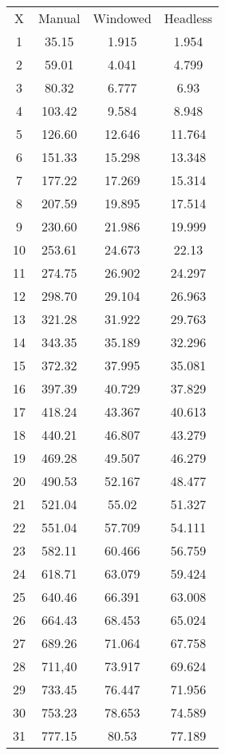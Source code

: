 \begin{table}[]
    \centering
    \begin{tabular}{c c c c}
    X & Manual & Windowed & Headless  \\
    1 & 35.15 & 1.915 & 1.954  \\
    2 & 59.01 & 4.041 & 4.799  \\
    3 & 80.32 & 6.777 & 6.93  \\
    4 & 103.42 & 9.584 & 8.948  \\
    5 & 126.60 & 12.646 & 11.764  \\
    6 & 151.33 & 15.298 & 13.348  \\
    7 & 177.22 & 17.269 & 15.314  \\
    8 & 207.59 & 19.895 & 17.514  \\
    9 & 230.60 & 21.986 & 19.999  \\
    10 & 253.61 & 24.673 & 22.13  \\
    11 & 274.75 & 26.902 & 24.297  \\
    12 & 298.70 & 29.104 & 26.963  \\
    13 & 321.28 & 31.922 & 29.763  \\
    14 & 343.35 & 35.189 & 32.296  \\
    15 & 372.32 & 37.995 & 35.081  \\
    16 & 397.39 & 40.729 & 37.829  \\
    17 & 418.24 & 43.367 & 40.613  \\
    18 & 440.21 & 46.807 & 43.279  \\
    19 & 469.28 & 49.507 & 46.279  \\
    20 & 490.53 & 52.167 & 48.477  \\
    21 & 521.04 & 55.02 & 51.327  \\
    22 & 551.04 & 57.709 & 54.111  \\
    23 & 582.11 & 60.466 & 56.759  \\
    24 & 618.71 & 63.079 & 59.424  \\
    25 & 640.46 & 66.391 & 63.008  \\
    26 & 664.43 & 68.453 & 65.024  \\
    27 & 689.26 & 71.064 & 67.758  \\
    28 & 711,40 & 73.917 & 69.624  \\
    29 & 733.45 & 76.447 & 71.956  \\
    30 & 753.23 & 78.653 & 74.589  \\
    31 & 777.15 & 80.53 & 77.189  \\

\end{tabular}
\end{table}
